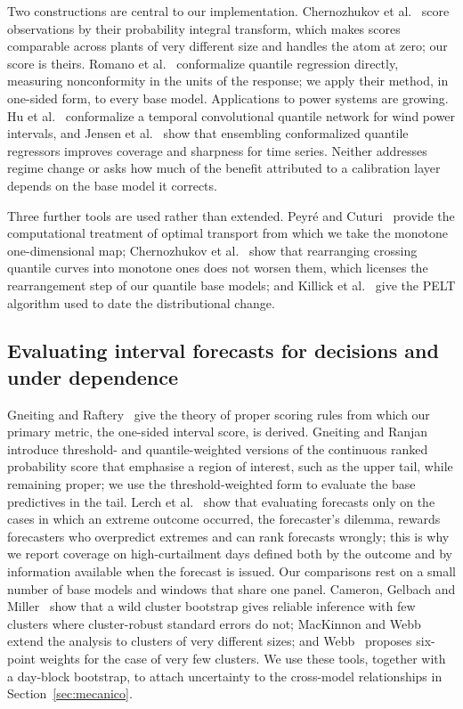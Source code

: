 Two constructions are central to our implementation. Chernozhukov et al.~\cite{chernozhukov2021} score observations by their probability integral transform, which makes scores comparable across plants of very different size and handles the atom at zero; our score is theirs. Romano et al.~\cite{romano2019} conformalize quantile regression directly, measuring nonconformity in the units of the response; we apply their method, in one-sided form, to every base model. Applications to power systems are growing. Hu et al.~\cite{hu2022} conformalize a temporal convolutional quantile network for wind power intervals, and Jensen et al.~\cite{jensen2024} show that ensembling conformalized quantile regressors improves coverage and sharpness for time series. Neither addresses regime change or asks how much of the benefit attributed to a calibration layer depends on the base model it corrects.

Three further tools are used rather than extended. Peyr\'e and Cuturi~\cite{peyre2019} provide the computational treatment of optimal transport from which we take the monotone one-dimensional map; Chernozhukov et al.~\cite{chernozhukov2010} show that rearranging crossing quantile curves into monotone ones does not worsen them, which licenses the rearrangement step of our quantile base models; and Killick et al.~\cite{killick2012} give the PELT algorithm used to date the distributional change.

\subsection{Evaluating interval forecasts for decisions and under dependence}
\label{sec:evalrel}

Gneiting and Raftery~\cite{gneiting2007} give the theory of proper scoring rules from which our primary metric, the one-sided interval score, is derived. Gneiting and Ranjan~\cite{gneiting2011} introduce threshold- and quantile-weighted versions of the continuous ranked probability score that emphasise a region of interest, such as the upper tail, while remaining proper; we use the threshold-weighted form to evaluate the base predictives in the tail. Lerch et al.~\cite{lerch2017} show that evaluating forecasts only on the cases in which an extreme outcome occurred, the forecaster's dilemma, rewards forecasters who overpredict extremes and can rank forecasts wrongly; this is why we report coverage on high-curtailment days defined both by the outcome and by information available when the forecast is issued. Our comparisons rest on a small number of base models and windows that share one panel. Cameron, Gelbach and Miller~\cite{cameron2008} show that a wild cluster bootstrap gives reliable inference with few clusters where cluster-robust standard errors do not; MacKinnon and Webb~\cite{mackinnon2017} extend the analysis to clusters of very different sizes; and Webb~\cite{webb2023} proposes six-point weights for the case of very few clusters. We use these tools, together with a day-block bootstrap, to attach uncertainty to the cross-model relationships in Section~\ref{sec:mecanico}.

